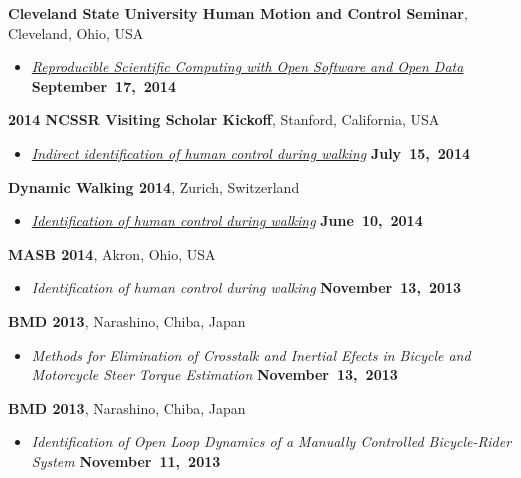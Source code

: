 \documentclass[10pt]{article}
\newenvironment{outerlist}[1][\enskip\textbullet]%
        {\begin{itemize}[#1]}{\end{itemize}%
         \vspace{-.6\baselineskip}}
\newcommand{\blankline}{\quad\pagebreak[2]}
\begin{document}
\blankline

\textbf{Cleveland State University Human Motion and Control Seminar}, Cleveland, Ohio, USA
\begin{outerlist}
\item[]
  \href{http://www.moorepants.info/presentations/2014/csu-fall-hmc-seminar}{\textit{Reproducible
    Scientific Computing with Open Software and Open Data}}
    \hfill \textbf{September~17,~2014}
\end{outerlist}

\blankline

\textbf{2014 NCSSR Visiting Scholar Kickoff}, Stanford, California, USA
\begin{outerlist}
\item[]
  \href{http://www.moorepants.info/presentations/2014/ncssr-kickoff}{\textit{Indirect
      identification of human control during walking}}
    \hfill \textbf{July~15,~2014}
\end{outerlist}

\blankline

\textbf{Dynamic Walking 2014}, Zurich, Switzerland
\begin{outerlist}
\item[]
  \href{http://www.moorepants.info/presentations/2014/DW2014}{\textit{Identification
  of human control during walking}}
    \hfill \textbf{June~10,~2014}
\end{outerlist}

\blankline

\textbf{MASB 2014}, Akron, Ohio, USA
\begin{outerlist}
\item[] \textit{Identification of human control during walking}
    \hfill \textbf{November~13,~2013}
\end{outerlist}

\blankline

\textbf{BMD 2013}, Narashino, Chiba, Japan
\begin{outerlist}
  \item[] \textit{Methods for Elimination of Crosstalk and Inertial Efects in
    Bicycle and Motorcycle Steer Torque Estimation}
    \hfill \textbf{November~13,~2013}
\end{outerlist}

\blankline

\textbf{BMD 2013}, Narashino, Chiba, Japan
\begin{outerlist}
  \item[] \textit{Identification of Open Loop Dynamics of a Manually Controlled
    Bicycle-Rider System}
    \hfill \textbf{November~11,~2013}
\end{outerlist}
\end{document}
